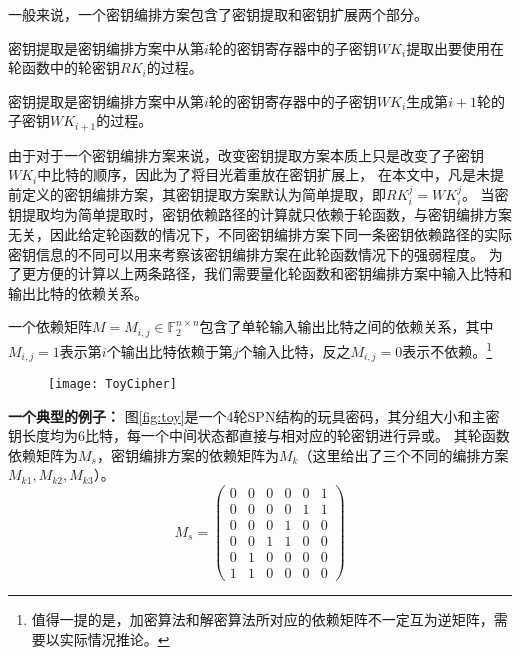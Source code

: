 一般来说，一个密钥编排方案包含了密钥提取和密钥扩展两个部分。
\begin{defn}[密钥提取]
    密钥提取是密钥编排方案中从第$i$轮的密钥寄存器中的子密钥$WK_i$提取出要使用在轮函数中的轮密钥$RK_i$的过程。
\end{defn}
\begin{defn}[密钥扩展]
    密钥提取是密钥编排方案中从第$i$轮的密钥寄存器中的子密钥$WK_i$生成第$i+1$轮的子密钥$WK_{i+1}$的过程。
\end{defn}
由于对于一个密钥编排方案来说，改变密钥提取方案本质上只是改变了子密钥$WK_i$中比特的顺序，因此为了将目光着重放在密钥扩展上，
在本文中，凡是未提前定义的密钥编排方案，其密钥提取方案默认为简单提取，即$RK_i^j=WK_i^j$。
当密钥提取均为简单提取时，密钥依赖路径的计算就只依赖于轮函数，与密钥编排方案无关，因此给定轮函数的情况下，不同密钥编排方案下同一条密钥依赖路径的实际密钥信息的不同可以用来考察该密钥编排方案在此轮函数情况下的强弱程度。
为了更方便的计算以上两条路径，我们需要量化轮函数和密钥编排方案中输入比特和输出比特的依赖关系。
\begin{defn}[依赖矩阵]
    一个依赖矩阵$M=M_{i,j}\in\mathbb{F}^{n\times n}_2$包含了单轮输入输出比特之间的依赖关系，其中$M_{i,j}=1$表示第$i$个输出比特依赖于第$j$个输入比特，反之$M_{i,j}=0$表示不依赖。\footnote{值得一提的是，加密算法和解密算法所对应的依赖矩阵不一定互为逆矩阵，需要以实际情况推论。}
\end{defn}
\begin{figure}[htbp]
\centering
    \texttt{[image: ToyCipher]}
\end{figure}
\textbf{一个典型的例子：}
图\ref{fig:toy}是一个4轮SPN结构的玩具密码，其分组大小和主密钥长度均为6比特，每一个中间状态都直接与相对应的轮密钥进行异或。
其轮函数依赖矩阵为$M_s$，密钥编排方案的依赖矩阵为$M_k$（这里给出了三个不同的编排方案$M_{k1},M_{k2},M_{k3}$）。
$$M_s=\left(
    \begin{array}{cccccc}
        0&0&0&0&0&1\\
        0&0&0&0&1&1\\
        0&0&0&1&0&0\\
        0&0&1&1&0&0\\
        0&1&0&0&0&0\\
        1&1&0&0&0&0
    \end{array}
\right)$$
